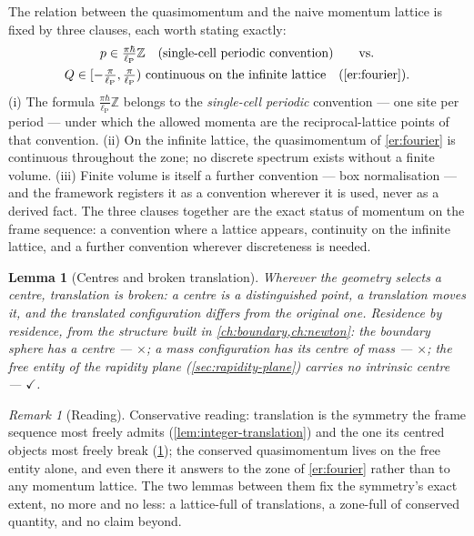 \documentclass[11pt]{amsbook}
\theoremstyle{plain}
\newtheorem{lemma}[theorem]{Lemma}
\theoremstyle{definition}
\theoremstyle{remark}
\newtheorem{remark}[theorem]{Remark}
\newcommand{\uses}[1]{\par\nopagebreak\noindent{\footnotesize\emph{Uses: #1.}\par}}
\begin{document}
The relation between the quasimomentum and the naive momentum lattice is fixed by three clauses, each worth stating exactly:
\begin{equation}\label{eq:correction}
\begin{gathered}
p \in \tfrac{\pi\hbar}{\ell_{\mathrm P}}\mathbb{Z}
\quad\text{(single-cell periodic convention)}
\qquad\text{vs.}\\
Q \in [-\tfrac{\pi}{\ell_{\mathrm P}}, \tfrac{\pi}{\ell_{\mathrm P}})\ \text{continuous on the infinite lattice}
\quad\text{(\cref{er:fourier})}.
\end{gathered}
\end{equation}
(i) The formula $\tfrac{\pi\hbar}{\ell_{\mathrm P}}\mathbb{Z}$ belongs to the \emph{single-cell periodic} convention --- one site per period --- under which the allowed momenta are the reciprocal-lattice points of that convention. (ii) On the infinite lattice, the quasimomentum of \cref{er:fourier} is continuous throughout the zone; no discrete spectrum exists without a finite volume. (iii) Finite volume is itself a further convention --- box normalisation --- and the framework registers it as a convention wherever it is used, never as a derived fact. The three clauses together are the exact status of momentum on the frame sequence: a convention where a lattice appears, continuity on the infinite lattice, and a further convention wherever discreteness is needed.

\begin{lemma}[Centres and broken translation]\label{lem:center-breaking}
Wherever the geometry selects a centre, translation is broken: a centre is a distinguished point, a translation moves it, and the translated configuration differs from the original one. Residence by residence, from the structure built in \cref{ch:boundary,ch:newton}: the boundary sphere has a centre --- $\times$; a mass configuration has its centre of mass --- $\times$; the free entity of the rapidity plane (\cref{sec:rapidity-plane}) carries no intrinsic centre --- $\checkmark$.
\uses{\cref{eq:shift}; geometric enumeration}
\end{lemma}

\begin{remark}[Reading]\label{rem:translation-reading}
Conservative reading: translation is the symmetry the frame sequence most freely admits (\cref{lem:integer-translation}) and the one its centred objects most freely break (\cref{lem:center-breaking}); the conserved quasimomentum lives on the free entity alone, and even there it answers to the zone of \cref{er:fourier} rather than to any momentum lattice. The two lemmas between them fix the symmetry's exact extent, no more and no less: a lattice-full of translations, a zone-full of conserved quantity, and no claim beyond.
\end{remark}
\end{document}
